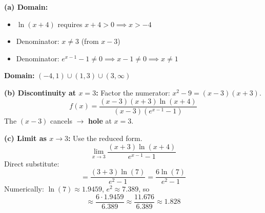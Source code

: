 \documentclass[11pt, letterpaper]{article}
\begin{document}
\begin{tcolorbox}[colback=examplebg, colframe=exampleborder,
  title={\bfseries Solution}, arc=3pt, boxrule=1pt]
\textbf{(a) Domain:}
\begin{itemize}[noitemsep]
  \item $\ln(x + 4)$ requires $x + 4 > 0 \implies x > -4$
  \item Denominator: $x \neq 3$ (from $x - 3$)
  \item Denominator: $e^{x-1} - 1 \neq 0 \implies x - 1 \neq 0 \implies x \neq 1$
\end{itemize}
\textbf{Domain:} $(-4, 1) \cup (1, 3) \cup (3, \infty)$

\textbf{(b) Discontinuity at $x = 3$:} Factor the numerator: $x^2 - 9 = (x - 3)(x + 3)$.
\[
f(x) = \frac{(x-3)(x+3)\ln(x+4)}{(x - 3)(e^{x-1} - 1)}
\]
The $(x - 3)$ cancels $\to$ \textbf{hole} at $x = 3$.

\textbf{(c) Limit as $x \to 3$:} Use the reduced form.
\[
\lim_{x \to 3} \frac{(x + 3)\ln(x + 4)}{e^{x - 1} - 1}
\]
Direct substitute:
\[
= \frac{(3 + 3)\ln(7)}{e^{2} - 1} = \frac{6\ln(7)}{e^2 - 1}
\]
Numerically: $\ln(7) \approx 1.9459$, $e^2 \approx 7.389$, so
\[
\approx \frac{6 \cdot 1.9459}{6.389} \approx \frac{11.676}{6.389} \approx 1.828
\]
\end{tcolorbox}
\end{document}
